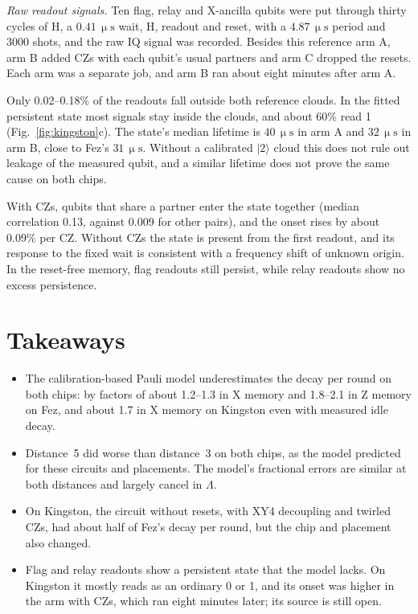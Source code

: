 \documentclass[aps,pra,reprint,nofootinbib,longbibliography,floatfix]{revtex4-2}
\newcommand{\ket}[1]{\lvert #1\rangle}
\newcommand{\us}{\,\upmu\mathrm{s}}
\begin{document}
\textit{Raw readout signals.}
Ten flag, relay and X-ancilla qubits were put through thirty cycles of H, a $0.41\us$ wait, H, readout and reset, with a $4.87\us$ period and 3000 shots, and the raw IQ signal was recorded.
Besides this reference arm A, arm B added CZs with each qubit's usual partners and arm C dropped the resets.
Each arm was a separate job, and arm B ran about eight minutes after arm A.

Only 0.02--0.18\% of the readouts fall outside both reference clouds.
In the fitted persistent state most signals stay inside the clouds, and about 60\% read 1 (Fig.~\ref{fig:kingston}c).
The state's median lifetime is $40\us$ in arm A and $32\us$ in arm B, close to Fez's $31\us$.
Without a calibrated $\ket{2}$ cloud this does not rule out leakage of the measured qubit, and a similar lifetime does not prove the same cause on both chips.

With CZs, qubits that share a partner enter the state together (median correlation 0.13, against 0.009 for other pairs), and the onset rises by about 0.09\% per CZ.
Without CZs the state is present from the first readout, and its response to the fixed wait is consistent with a frequency shift of unknown origin.
In the reset-free memory, flag readouts still persist, while relay readouts show no excess persistence.

\section{Takeaways}

\begin{itemize}
\item The calibration-based Pauli model underestimates the decay per round on both chips: by factors of about 1.2--1.3 in X memory and 1.8--2.1 in Z memory on Fez, and about 1.7 in X memory on Kingston even with measured idle decay.
\item Distance~5 did worse than distance~3 on both chips, as the model predicted for these circuits and placements. The model's fractional errors are similar at both distances and largely cancel in $\Lambda$.
\item On Kingston, the circuit without resets, with XY4 decoupling and twirled CZs, had about half of Fez's decay per round, but the chip and placement also changed.
\item Flag and relay readouts show a persistent state that the model lacks. On Kingston it mostly reads as an ordinary 0 or 1, and its onset was higher in the arm with CZs, which ran eight minutes later; its source is still open.
\end{itemize}
\end{document}
